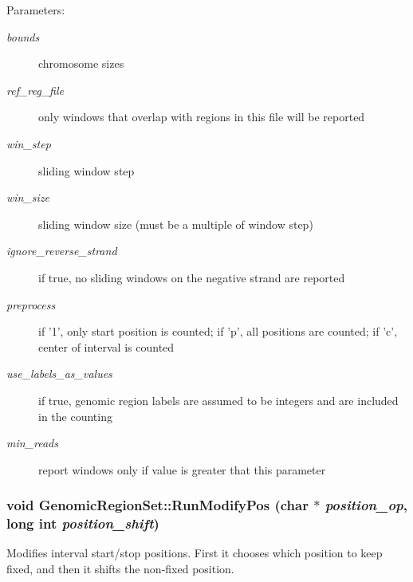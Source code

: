 \begin{Desc}
\item[Parameters:]
\begin{description}
\item[{\em bounds}]chromosome sizes \item[{\em ref\_\-reg\_\-file}]only windows that overlap with regions in this file will be reported \item[{\em win\_\-step}]sliding window step \item[{\em win\_\-size}]sliding window size (must be a multiple of window step) \item[{\em ignore\_\-reverse\_\-strand}]if true, no sliding windows on the negative strand are reported \item[{\em preprocess}]if '1', only start position is counted; if 'p', all positions are counted; if 'c', center of interval is counted \item[{\em use\_\-labels\_\-as\_\-values}]if true, genomic region labels are assumed to be integers and are included in the counting \item[{\em min\_\-reads}]report windows only if value is greater that this parameter \end{description}
\end{Desc}
\hypertarget{classGenomicRegionSet_11f1e58c92e9b0b2e3feb5821cff1a55}{
\subsubsection[RunModifyPos]{\setlength{\rightskip}{0pt plus 5cm}void GenomicRegionSet::RunModifyPos (char $\ast$ {\em position\_\-op}, \/  long int {\em position\_\-shift})}}
\label{classGenomicRegionSet_11f1e58c92e9b0b2e3feb5821cff1a55}


Modifies interval start/stop positions. First it chooses which position to keep fixed, and then it shifts the non-fixed position. 

